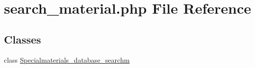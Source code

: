 \hypertarget{search__material_8php}{\section{search\+\_\+material.\+php File Reference}
\label{search__material_8php}
}
\subsection*{Classes}
\begin{DoxyCompactItemize}
\item 
class \hyperlink{classSpecialmaterials__database__searchm}{Specialmaterials\+\_\+database\+\_\+searchm}
\end{DoxyCompactItemize}
